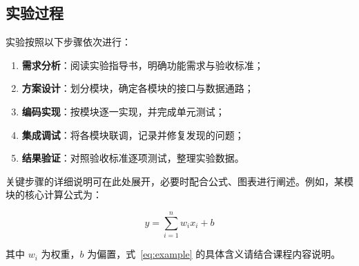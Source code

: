 \subsection{实验过程}

实验按照以下步骤依次进行：

\begin{enumerate}
    \item \textbf{需求分析}：阅读实验指导书，明确功能需求与验收标准；
    \item \textbf{方案设计}：划分模块，确定各模块的接口与数据通路；
    \item \textbf{编码实现}：按模块逐一实现，并完成单元测试；
    \item \textbf{集成调试}：将各模块联调，记录并修复发现的问题；
    \item \textbf{结果验证}：对照验收标准逐项测试，整理实验数据。
\end{enumerate}

关键步骤的详细说明可在此处展开，必要时配合公式、图表进行阐述。例如，某模块的核心计算公式为：

\begin{equation}
    y = \sum_{i=1}^{n} w_i x_i + b
    \label{eq:example}
\end{equation}

其中 $w_i$ 为权重，$b$ 为偏置，式~\eqref{eq:example} 的具体含义请结合课程内容说明。